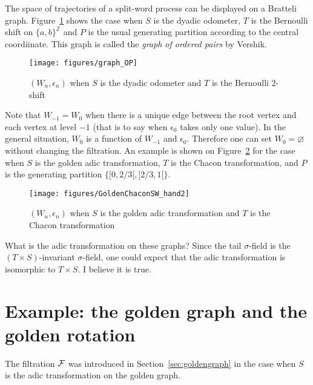 \documentclass[12pt,a4paper]{article}
\begin{document}
The space of trajectories of a split-word process can be displayed on 
a Bratteli graph. 
Figure~\ref{fig:SW} shows the case when $S$ is the dyadic odometer, 
$T$ is the Bernoulli shift on $\{a,b\}^{\mathbb{Z}}$ and $P$ is the 
usual generating partition according to the central coordiinate. 
This graph is called the \emph{graph of ordered pairs} by Vershik. 

\begin{figure}[!h]
\centering
	\texttt{[image: figures/graph\_OP]}
\caption{$(W_n,\epsilon_n)$ when $S$ is the dyadic odometer and $T$ is the Bernoulli $2$-shift}
\label{fig:SW}
\end{figure}



Note that $W_{-1}=W_0$ when there is a unique edge between the root vertex and each vertex at 
level $-1$ (that is to say when $\epsilon_0$ takes only one value). 
In the general situation,  $W_0$ is a function of $W_{-1}$ and $\epsilon_0$. 
Therefore one can set $W_0=\varnothing$ without changing the filtration. 
An example is shown on Figure~\ref{fig:GoldenChacon} for the case when 
$S$ is the golden adic transformation, $T$ is the Chacon transformation, 
and $P$ is the generating partition $\{[0,2/3[, [2/3, 1[\}$.  

\begin{figure}[!h]
\centering
	\texttt{[image: figures/GoldenChaconSW\_hand2]}
\caption{$(W_n,\epsilon_n)$ when $S$ is the golden adic transformation and $T$ is the Chacon transformation}
\label{fig:GoldenChacon}
\end{figure}

\begin{question}
What is the adic transformation on these graphs? 
Since the tail $\sigma$-field is the $(T\times S)$-invariant $\sigma$-field, 
one could expect that the adic transformation is isomorphic to $T \times S$. 
I believe it is true.
\end{question}

\section{Example: the golden graph and the golden rotation}

The filtration $\mathcal{F}$ was introduced in Section~\ref{sec:goldengraph}
in the case when $S$ is the adic transformation on the golden graph. 
\end{document}
